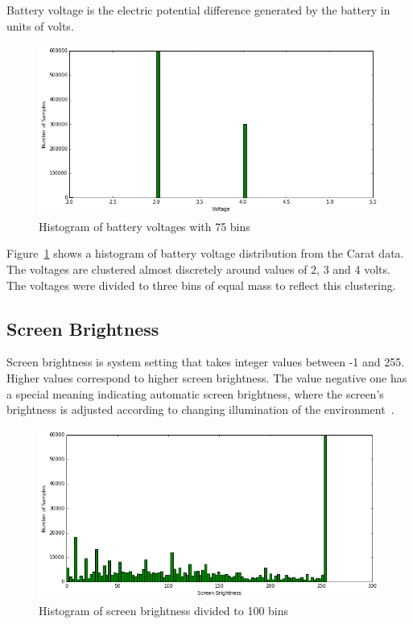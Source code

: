 Battery voltage is the electric potential difference generated by the battery in units of volts.

\begin{figure}[!htbp]
	\centering
	\includegraphics[width=\textwidth]{images/carat-data/battery_voltage.png}
	\caption{Histogram of battery voltages with 75 bins}
	\label{figure:carat-data-battery-voltage}
\end{figure}  

Figure~\ref{figure:carat-data-battery-voltage} shows a histogram of battery voltage distribution from the Carat data. The voltages are clustered almost discretely around values of 2, 3 and 4 volts. The voltages were divided to three bins of equal mass to reflect this clustering.    

\subsection{Screen Brightness}  

Screen brightness is system setting that takes integer values between -1 and 255. Higher values correspond to higher screen brightness. The value negative one has a special meaning indicating automatic screen brightness, where the screen's brightness is adjusted according to changing illumination of the environment~\cite{PELTONEN201671}.

\begin{figure}[!htbp]
	\centering
	\includegraphics[width=\textwidth]{images/carat-data/screen_brightness.png}
	\caption{Histogram of screen brightness divided to 100 bins}
	\label{figure:carat-data-screen-brightness}
\end{figure}    

